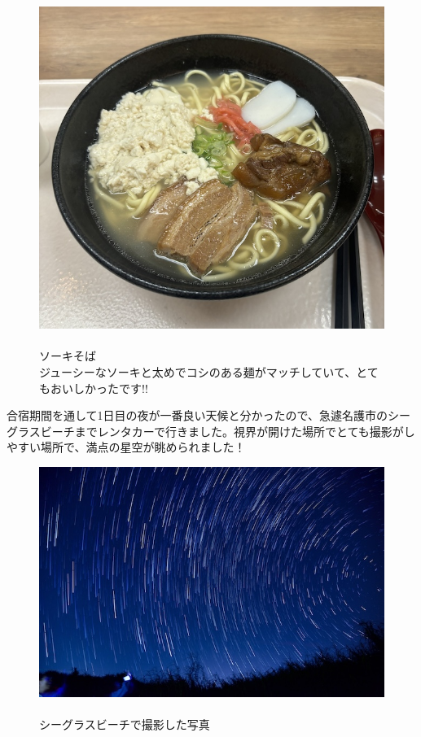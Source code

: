 \documentclass[../main]{subfiles}
\begin{document}
\begin{figure}[H]
  \begin{minipage}[b]{0.38\columnwidth}
    \caption{\\
    ソーキそば\\
    ジューシーなソーキと太めでコシのある麺がマッチしていて、とてもおいしかったです!!
    }
  \end{minipage}
  \hspace{0.04\columnwidth} %
  \begin{minipage}[b]{0.58\columnwidth}
    \centering
    \includegraphics[width=0.7\columnwidth]{figure/okinawasoba.jpg}
  \end{minipage}
\end{figure}

合宿期間を通して1日目の夜が一番良い天候と分かったので、急遽名護市のシーグラスビーチまでレンタカーで行きました。視界が開けた場所でとても撮影がしやすい場所で、満点の星空が眺められました！
\begin{figure}[H]
  \begin{minipage}[b]{0.58\columnwidth}
    \centering
    \includegraphics[width=\columnwidth]{figure/hosi_suttakku_1nitime.jpg}
  \end{minipage}
  \hspace{0.04\columnwidth} %
  \begin{minipage}[b]{0.38\columnwidth}
    \caption{\\
    シーグラスビーチで撮影した写真
    }
  \end{minipage}
\end{figure}
\end{document}
